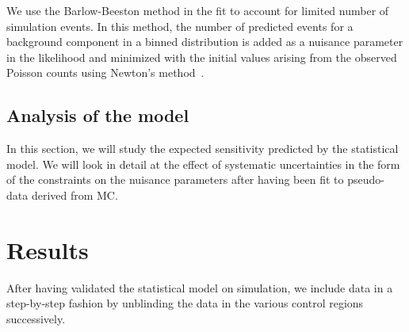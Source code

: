 We use the Barlow-Beeston method in the fit to account for limited number of simulation events. In this method, the number of predicted events for a background component in a binned distribution is added as a nuisance parameter in the likelihood and minimized with the initial values arising from the observed Poisson counts using Newton's method~\cite{Barlow:1993dm}. 

\subsection{Analysis of the model}
In this section, we will study the expected sensitivity predicted by the statistical model. We will look in detail at the effect of systematic uncertainties in the form of the constraints on the nuisance parameters after having been fit to pseudo-data derived from MC.

\section{Results}
After having validated the statistical model on simulation, we include data in a step-by-step fashion by unblinding the data in the various control regions successively.
